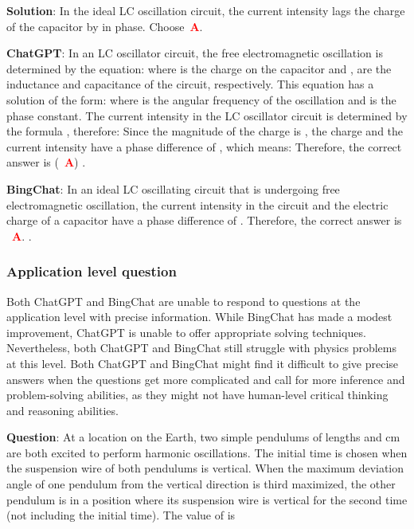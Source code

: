 \documentclass{article}
\begin{document}
{\begin{mdframed}[linewidth=1pt,linecolor=red]
		\begin{oneparchoices}
			\choice 
			\choice 
			\choice 
			\choice 
		\end{oneparchoices}
		
		\textbf{Solution}: In the ideal LC oscillation circuit, the current intensity lags the charge of the capacitor by  in phase. Choose~\textcolor{red}{\textbf{A}}. 
		
		\textbf{ChatGPT}: In an LC oscillator circuit, the free electromagnetic oscillation is determined by the equation:  where  is the charge on the capacitor and ,  are the inductance and capacitance of the circuit, respectively. This equation has a solution of the form:  where  is the angular frequency of the oscillation and  is the phase constant.
		The current intensity in the LC oscillator circuit is determined by the formula , therefore:  Since the magnitude of the charge is , the charge  and the current intensity  have a phase difference of , which means:  Therefore, the correct answer is (~\textcolor{red}{\textbf{A}}) .
		
		\textbf{BingChat}: In an ideal LC oscillating circuit that is undergoing free electromagnetic oscillation, the current intensity in the circuit and the electric charge of a capacitor have a phase difference of . Therefore, the correct answer is ~\textcolor{red}{\textbf{A}}. .
		
	\end{mdframed}	
	
	\subsubsection{Application level question}
	\label{VNHSGE_Phy_A}
	
	Both ChatGPT and BingChat are unable to respond to questions at the application level with precise information. While BingChat has made a modest improvement, ChatGPT is unable to offer appropriate solving techniques. Nevertheless, both ChatGPT and BingChat still struggle with physics problems at this level. Both ChatGPT and BingChat might find it difficult to give precise answers when the questions get more complicated and call for more inference and problem-solving abilities, as they might not have human-level critical thinking and reasoning abilities.
	
	
	\begin{mdframed}[linewidth=1pt,linecolor=red] \textbf{Question}: At a location on the Earth, two simple pendulums of lengths  and  cm are both excited to perform harmonic oscillations. The initial time is chosen when the suspension wire of both pendulums is vertical. When the maximum deviation angle of one pendulum from the vertical direction is third maximized, the other pendulum is in a position where its suspension wire is vertical for the second time (not including the initial time). The value of  is
		

\end{mdframed}}
\end{document}
